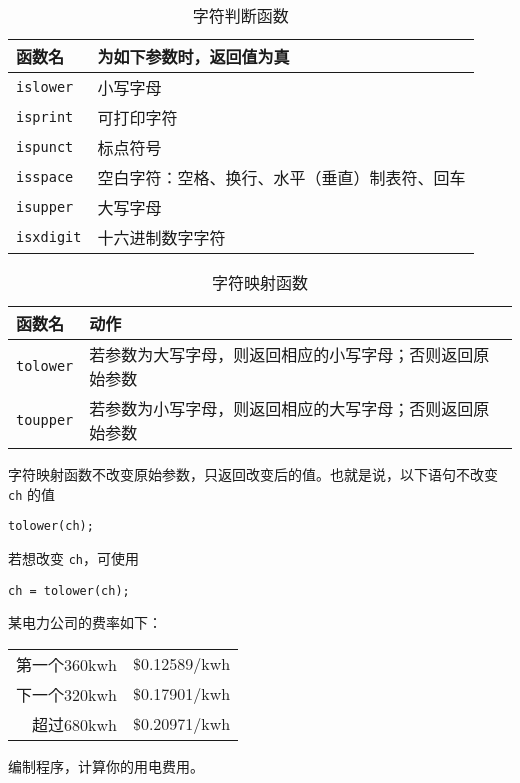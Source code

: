 \begin{frame}[fragile]
\begin{table}
\centering
\caption{字符判断函数}
\begin{tabular}{p{2cm}|p{8cm}}\hline
函数名&为如下参数时，返回值为真\\\hline\hline
\lstinline|islower| & 小写字母\\[0.1in]
\lstinline|isprint| & 可打印字符 \\[0.1in]
\lstinline|ispunct| & 标点符号 \\[0.1in] 
\lstinline|isspace| & 空白字符：空格、换行、水平（垂直）制表符、回车 \\[0.1in] 
\lstinline|isupper| & 大写字母 \\[0.1in] 
\lstinline|isxdigit| & 十六进制数字字符 \\\hline
\end{tabular}
\end{table}
\end{frame}

\begin{frame}[fragile]
\begin{table}
\centering
\caption{字符映射函数}
\begin{tabular}{p{2cm}|p{8cm}}\hline
函数名&动作\\\hline\hline 
\lstinline|tolower| & 若参数为大写字母，则返回相应的小写字母；否则返回原始参数\\[0.1in]
\lstinline|toupper| & 若参数为小写字母，则返回相应的大写字母；否则返回原始参数 \\\hline
\end{tabular}
\end{table}
\end{frame}

\begin{frame}[fragile]
字符映射函数不改变原始参数，只返回改变后的值。也就是说，以下语句不改变 \lstinline|ch| 的值
\begin{lstlisting}
tolower(ch);
\end{lstlisting}
若想改变 \lstinline|ch|，可使用
\begin{lstlisting}
ch = tolower(ch);
\end{lstlisting}
\end{frame}

\begin{frame}[fragile]
\begin{free}[例]{}
某电力公司的费率如下：
\begin{table}
\centering
\begin{tabular}{r|l}\hline
第一个360kwh& \$0.12589/kwh\\[0.1in]
下一个320kwh& \$0.17901/kwh\\[0.1in]
超过680kwh & \$0.20971/kwh
\\\hline
\end{tabular}
\end{table}
编制程序，计算你的用电费用。
\end{free}
\end{frame}


